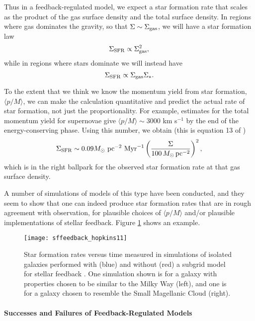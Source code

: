 Thus in a feedback-regulated model, we expect a star formation rate that scales as the product of the gas surface density and the total surface density. In regions where gas dominates the gravity, so that $\Sigma \sim \Sigma_{\rm gas}$, we will have a star formation law
\begin{equation}
\Sigma_{\rm SFR} \propto \Sigma_{\rm gas}^2,
\end{equation}
while in regions where stars dominate we will instead have
\begin{equation}
\Sigma_{\rm SFR} \propto \Sigma_{\rm gas} \Sigma_*.
\end{equation}

To the extent that we think we know the momentum yield from star formation, $\langle p/M\rangle$, we can make the calculation quantitative and predict the actual rate of star formation, not just the proportionality. For example, estimates for the total momentum yield for supernovae give $\langle p/M\rangle \sim 3000$ km s$^{-1}$ by the end of the energy-conserving phase. Using this number, we obtain (this is equation 13 of \citealt{ostriker11a})
\begin{equation}
\Sigma_{\rm SFR} \sim 0.09 M_\odot\mbox{ pc}^{-2}\mbox{ Myr}^{-1} \left(\frac{\Sigma}{100\,M_\odot\,\mathrm{pc}^{-2}}\right)^2,
\end{equation}
which is in the right ballpark for the observed star formation rate at that gas surface density.

A number of simulations of models of this type have been conducted, and they seem to show that one can indeed produce star formation rates that are in rough agreement with observation, for plausible choices of $\langle p/M\rangle$ and/or plausible implementations of stellar feedback. Figure \ref{fig:sffeedback_hopkins11} shows an example.

\begin{figure}
\texttt{[image: sffeedback\_hopkins11]}
\caption[Star formation rates in galaxy simulations with and without stellar feedback]{
\label{fig:sffeedback_hopkins11}
Star formation rates versus time measured in simulations of isolated galaxies performed with (blue) and without (red) a subgrid model for stellar feedback \citep{hopkins11a}. One simulation shown is for a galaxy with properties chosen to be similar to the Milky Way (left), and one is for a galaxy chosen to resemble the Small Magellanic Cloud (right).
}
\end{figure}

\paragraph{Successes and Failures of Feedback-Regulated Models}

